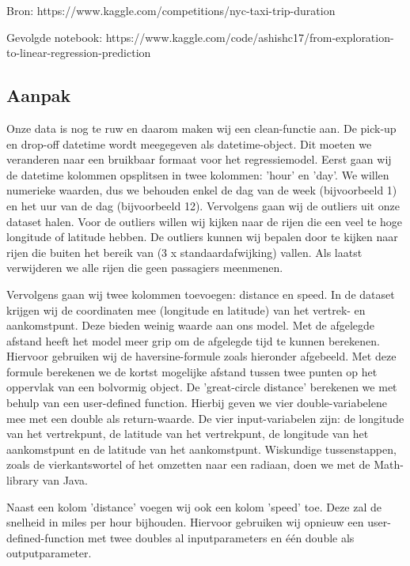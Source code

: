 \documentclass[a4paper,12pt,twoside]{report}
\begin{document}
Bron: https://www.kaggle.com/competitions/nyc-taxi-trip-duration

Gevolgde notebook: https://www.kaggle.com/code/ashishc17/from-exploration-to-linear-regression-prediction

\subsection*{Aanpak}

Onze data is nog te ruw en daarom maken wij een clean-functie aan. De pick-up en drop-off datetime wordt meegegeven als datetime-object. Dit moeten we veranderen naar een bruikbaar formaat voor het regressiemodel. Eerst gaan wij de datetime kolommen opsplitsen in twee kolommen: 'hour' en 'day'. We willen numerieke waarden, dus we behouden enkel de dag van de week (bijvoorbeeld 1) en het uur van de dag (bijvoorbeeld 12). Vervolgens gaan wij de outliers uit onze dataset halen. Voor de outliers willen wij kijken naar de rijen die een veel te hoge longitude of latitude hebben. De outliers kunnen wij bepalen door te kijken naar rijen die buiten het bereik van (3 x standaardafwijking) vallen. Als laatst verwijderen we alle rijen die geen passagiers meenmenen. 

Vervolgens gaan wij twee kolommen toevoegen: distance en speed. In de dataset krijgen wij de coordinaten mee (longitude en latitude) van het vertrek- en aankomstpunt. Deze bieden weinig waarde aan ons model. Met de afgelegde afstand heeft het model meer grip om de afgelegde tijd te kunnen berekenen. Hiervoor gebruiken wij de haversine-formule zoals hieronder afgebeeld. Met deze formule berekenen we de kortst mogelijke afstand tussen twee punten op het oppervlak van een bolvormig object. De 'great-circle distance' berekenen we met behulp van een user-defined function. Hierbij geven we vier double-variabelene mee met een double als return-waarde. De vier input-variabelen zijn: de longitude van het vertrekpunt, de latitude van het vertrekpunt, de longitude van het aankomstpunt en de latitude van het aankomstpunt. Wiskundige tussenstappen, zoals de vierkantswortel of het omzetten naar een radiaan, doen we met de Math-library van Java.

Naast een kolom 'distance' voegen wij ook een kolom 'speed' toe. Deze zal de snelheid in miles per hour bijhouden. Hiervoor gebruiken wij opnieuw een user-defined-function met twee doubles al inputparameters en één double als outputparameter.
\end{document}
